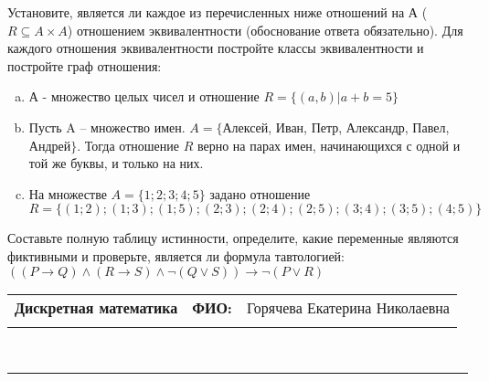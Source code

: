 \documentclass[10pt]{exam}
\newcommand{\class}{Дискретная математика}
\newcommand{\examdate}{}
\begin{document}
\begin{questions}
\question
Установите, является ли каждое из перечисленных ниже отношений на А ($R \subseteq A \times A$) отношением эквивалентности (обоснование ответа обязательно). Для каждого отношения эквивалентности постройте классы 
эквивалентности и постройте граф отношения:
\begin{enumerate} [a)]\setcounter{enumi}{0}
\item А - множество целых чисел и отношение $R = \{(a,b)|a + b = 5\}$
\item Пусть A – множество имен. $A = \{ $Алексей, Иван, Петр, Александр, Павел, Андрей$ \}$. Тогда отношение $R $ верно на парах имен, начинающихся с одной и той же буквы, и только на них.
\item На множестве $A = \{1; 2; 3; 4; 5\}$ задано отношение $R = \{(1; 2); (1; 3); (1; 5); (2; 3); (2; 4); (2; 5); (3; 4); (3; 5); (4; 5)\}$
\end{enumerate}\question Составьте полную таблицу истинности, определите, какие переменные являются фиктивными и проверьте, является ли формула тавтологией:
$((P \rightarrow Q) \land (R \rightarrow S) \land \neg (Q \lor S)) \rightarrow \neg (P \lor R)$

\end{questions}
\newpage
\begin{flushright}
\begin{tabular}{p{2.8in} r l}
\textbf{\class} & \textbf{ФИО:} &Горячева Екатерина Николаевна
\\

\textbf{\examdate} &&\\
\end{tabular}\\
\end{flushright}
\rule[1ex]{\textwidth}{.1pt}
\end{document}
